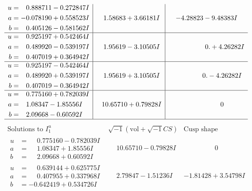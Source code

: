 \documentclass[1p]{elsarticle_modified}
\theoremstyle{definition}
\newcommand{\I}{\sqrt{-1}}
\begin{document}
$$\begin{array}{c|c|c}
\begin{aligned}
u &= \phantom{-}0.888711 - 0.272847 I \\
a &= -0.078190 + 0.558523 I \\
b &= \phantom{-}0.405126 - 0.581562 I\end{aligned}
 & \phantom{-}1.58683 + 3.66181 I & -4.28823 - 9.48383 I \\ \hline\begin{aligned}
u &= \phantom{-}0.925197 + 0.542464 I \\
a &= \phantom{-}0.489920 - 0.539197 I \\
b &= \phantom{-}0.407019 + 0.364942 I\end{aligned}
 & \phantom{-}1.95619 - 3.10505 I & \phantom{-0.000000 -}0. + 4.26282 I \\ \hline\begin{aligned}
u &= \phantom{-}0.925197 - 0.542464 I \\
a &= \phantom{-}0.489920 + 0.539197 I \\
b &= \phantom{-}0.407019 - 0.364942 I\end{aligned}
 & \phantom{-}1.95619 + 3.10505 I & \phantom{-0.000000 } 0. - 4.26282 I \\ \hline\begin{aligned}
u &= \phantom{-}0.775160 + 0.782039 I \\
a &= \phantom{-}1.08347 - 1.85556 I \\
b &= \phantom{-}2.09668 - 0.60592 I\end{aligned}
 & \phantom{-}10.65710 + 0.79828 I & \phantom{-0.000000 } 0\\
 \hline 
 \end{array}$$\newpage$$\begin{array}{c|c|c}  
\text{Solutions to }I^u_{1}& \I (\text{vol} + \sqrt{-1}CS) & \text{Cusp shape}\\
 \hline 
\begin{aligned}
u &= \phantom{-}0.775160 - 0.782039 I \\
a &= \phantom{-}1.08347 + 1.85556 I \\
b &= \phantom{-}2.09668 + 0.60592 I\end{aligned}
 & \phantom{-}10.65710 - 0.79828 I & \phantom{-0.000000 } 0 \\ \hline\begin{aligned}
u &= \phantom{-}0.639144 + 0.625775 I \\
a &= \phantom{-}0.407955 + 0.337968 I \\
b &= -0.642419 + 0.534726 I\end{aligned}
 & \phantom{-}2.79847 - 1.51236 I & -1.81428 + 3.54798 I \\ \hline\begin{aligned}

\end{aligned}
\end{array}$$
\end{document}
